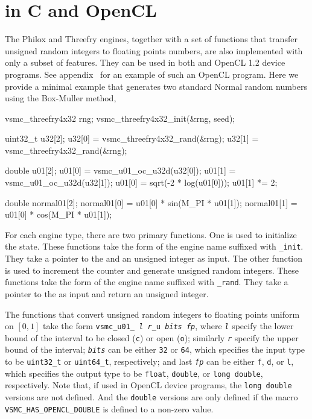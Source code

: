 \section{\protect\rng in C and OpenCL}
\label{sec:RNG in C and OpenCL}

The Philox and Threefry engines, together with a set of functions that transfer
unsigned random integers to floating points numbers, are also implemented with
only a subset of \cnn features. They can be used in both \cnn and OpenCL 1.2
device programs. See appendix~ for an example of such an OpenCL program. Here we provide a minimal
example that generates two standard Normal random numbers using the Box-Muller
method,
\begin{ccode}
    vsmc_threefry4x32 rng;
    vsmc_threefry4x32_init(&rng, seed);

    uint32_t u32[2];
    u32[0] = vsmc_threefry4x32_rand(&rng);
    u32[1] = vsmc_threefry4x32_rand(&rng);

    double u01[2];
    u01[0] = vsmc_u01_oc_u32d(u32[0]);
    u01[1] = vsmc_u01_oc_u32d(u32[1]);
    u01[0] = sqrt(-2 * log(u01[0]));
    u01[1] *= 2;

    double normal01[2];
    normal01[0] = u01[0] * sin(M_PI * u01[1]);
    normal01[1] = u01[0] * cos(M_PI * u01[1]);
\end{ccode}
For each engine type, there are two primary functions. One is used to
initialize the state. These functions take the form of the engine name suffixed
with \verb|_init|. They take a pointer to the \rng and an unsigned integer as
input. The other function is used to increment the counter and generate
unsigned random integers. These functions take the form of the engine name
suffixed with \verb|_rand|. They take a pointer to the \rng as input and return
an unsigned integer.

The functions that convert unsigned random integers to floating points uniform
on $[0, 1]$ take the form
\texttt{vsmc\_u01\_%
  \textcolor{MRed}{\textit{l}}%
  \textcolor{MRed}{\textit{r}}\_u%
  \textcolor{MRed}{\textit{bits}}%
  \textcolor{MRed}{\textit{fp}}},
where \texttt{\textcolor{MRed}{\textit{l}}} specify the lower bound of the
interval to be closed (\verb|c|) or open (\verb|o|); similarly
\texttt{\textcolor{MRed}{\textit{r}}} specify the upper bound of the interval;
\texttt{\textcolor{MRed}{\textit{bits}}} can be either \verb|32| or \verb|64|,
which specifies the input type to be \verb|uint32_t| or \verb|uint64_t|,
respectively; and last \texttt{\textcolor{MRed}{\textit{fp}}} can be either
\verb|f|, \verb|d|, or \verb|l|, which specifies the output type to be
\verb|float|, \verb|double|, or \verb|long double|, respectively. Note that, if
used in OpenCL device programs, the \verb|long double| versions are not
defined. And the \verb|double| versions are only defined if the macro
\verb|VSMC_HAS_OPENCL_DOUBLE| is defined to a non-zero value.
